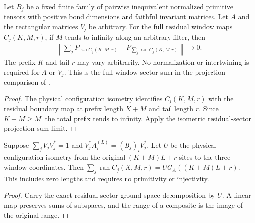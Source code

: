 \begin{lemma}
    \label{thm:residual_window_full_sector_sum}
    \leanok
    Let $B_j$ be a fixed finite family of pairwise inequivalent normalized
    primitive tensors with positive bond dimensions and faithful invariant
    matrices. Let $A$ and the rectangular matrices $V_j$ be arbitrary.
    For the full residual window maps $C_j(K,M,r)$, if $M$ tends to infinity
    along an arbitrary filter, then
    \begin{align}
        \left\|\sum_jP_{\operatorname{ran}C_j(K,M,r)}
        -P_{\sum_j\operatorname{ran}C_j(K,M,r)}\right\|\longrightarrow0.
    \end{align}
    The prefix $K$ and tail $r$ may vary arbitrarily.
    No normalization or intertwining is required for $A$ or $V_j$.
    This is the full-window sector sum in the projection comparison of
    \cite[Lemma~commutation(i)]{Nachtergaele1996Spectral}.
\end{lemma}
\begin{proof}\leanok
    The physical configuration isometry identifies $C_j(K,M,r)$ with
    the residual boundary map at prefix length $K+M$ and tail length $r$.
    Since $K+M\geq M$, the total prefix tends to infinity.
    Apply the isometric residual-sector projection-sum limit.
\end{proof}

\begin{lemma}
    \label{thm:residual_window_full_joint_range}
    \leanok
    Suppose $\sum_jV_jV_j^*=1$ and
    $V_j^*A^{(L)}_i=(B_j)_iV_j^*$.
    Let $U$ be the physical configuration isometry from the original
    $(K+M)L+r$ sites to the three-window coordinates. Then
    $\sum_j\operatorname{ran}C_j(K,M,r)=U G_A((K+M)L+r)$.
    This includes zero lengths and requires no primitivity or injectivity.
\end{lemma}
\begin{proof}\leanok
    Carry the exact residual-sector ground-space decomposition by $U$.
    A linear map preserves sums of subspaces, and the range of a composite
    is the image of the original range.
\end{proof}


